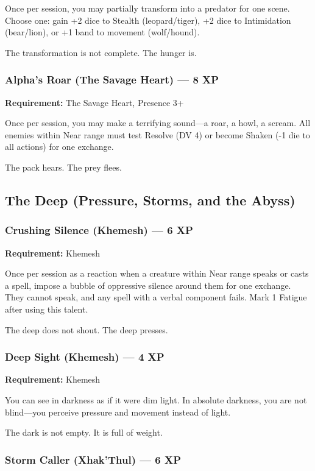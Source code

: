 Once per session, you may partially transform into a predator for one scene. Choose one: gain +2 dice to Stealth (leopard/tiger), +2 dice to Intimidation (bear/lion), or +1 band to movement (wolf/hound).

The transformation is not complete. The hunger is.

\subsubsection{Alpha's Roar (The Savage Heart) — 8 XP}

\textbf{Requirement:} The Savage Heart, Presence 3+

Once per session, you may make a terrifying sound—a roar, a howl, a scream. All enemies within Near range must test Resolve (DV 4) or become Shaken (-1 die to all actions) for one exchange.

The pack hears. The prey flees.

\subsection{The Deep (Pressure, Storms, and the Abyss)}

\subsubsection{Crushing Silence (Khemesh) — 6 XP}

\textbf{Requirement:} Khemesh

Once per session as a reaction when a creature within Near range speaks or casts a spell, impose a bubble of oppressive silence around them for one exchange. They cannot speak, and any spell with a verbal component fails. Mark 1 Fatigue after using this talent.

The deep does not shout. The deep presses.

\subsubsection{Deep Sight (Khemesh) — 4 XP}

\textbf{Requirement:} Khemesh

You can see in darkness as if it were dim light. In absolute darkness, you are not blind—you perceive pressure and movement instead of light.

The dark is not empty. It is full of weight.

\subsubsection{Storm Caller (Xhak'Thul) — 6 XP}

